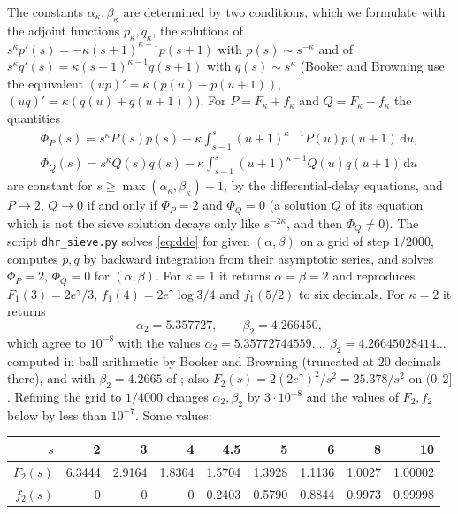 ﻿\documentclass[11pt]{amsart}
\theoremstyle{remark}
\newcommand{\dd}{\mathrm{d}}
\begin{document}
The constants $\alpha_\kappa,\beta_\kappa$ are determined by two conditions, which we formulate with the adjoint functions $p_\kappa,q_\kappa$, the solutions of $s^\kappa p'(s)=-\kappa(s+1)^{\kappa-1}p(s+1)$ with $p(s)\sim s^{-\kappa}$ and of $s^\kappa q'(s)=\kappa(s+1)^{\kappa-1}q(s+1)$ with $q(s)\sim s^{\kappa}$ (Booker and Browning \cite{BB} use the equivalent $(up)'=\kappa(p(u)-p(u+1))$, $(uq)'=\kappa(q(u)+q(u+1))$). For $P=F_\kappa+f_\kappa$ and $Q=F_\kappa-f_\kappa$ the quantities
\begin{gather*}
\Phi_P(s)=s^\kappa P(s)p(s)+\kappa\int_{s-1}^s(u+1)^{\kappa-1}P(u)p(u+1)\,\dd u,\\
\Phi_Q(s)=s^\kappa Q(s)q(s)-\kappa\int_{s-1}^s(u+1)^{\kappa-1}Q(u)q(u+1)\,\dd u
\end{gather*}
are constant for $s\ge\max(\alpha_\kappa,\beta_\kappa)+1$, by the differential-delay equations, and $P\to2$, $Q\to0$ if and only if $\Phi_P=2$ and $\Phi_Q=0$ (a solution $Q$ of its equation which is not the sieve solution decays only like $s^{-2\kappa}$, and then $\Phi_Q\ne0$). The script \texttt{dhr\_sieve.py} solves \eqref{eq:dde} for given $(\alpha,\beta)$ on a grid of step $1/2000$, computes $p,q$ by backward integration from their asymptotic series, and solves $\Phi_P=2$, $\Phi_Q=0$ for $(\alpha,\beta)$. For $\kappa=1$ it returns $\alpha=\beta=2$ and reproduces $F_1(3)=2e^\gamma/3$, $f_1(4)=2e^\gamma\log3/4$ and $f_1(5/2)$ to six decimals. For $\kappa=2$ it returns
\[
\alpha_2=5.357727,\qquad \beta_2=4.266450,
\]
which agree to $10^{-8}$ with the values $\alpha_2=5.35772744559\ldots$, $\beta_2=4.26645028414\ldots$ computed in ball arithmetic by Booker and Browning \cite{BB} (truncated at $20$ decimals there), and with $\beta_2=4.2665$ of \cite{DHR}; also $F_2(s)=2(2e^\gamma)^2/s^2=25.378/s^2$ on $(0,2]$. Refining the grid to $1/4000$ changes $\alpha_2,\beta_2$ by $3\cdot10^{-8}$ and the values of $F_2,f_2$ below by less than $10^{-7}$. Some values:
\begin{center}
\small
\begin{tabular}{r|rrrrrrrr}
$s$ & 2 & 3 & 4 & 4.5 & 5 & 6 & 8 & 10\\
\hline
$F_2(s)$ & 6.3444 & 2.9164 & 1.8364 & 1.5704 & 1.3928 & 1.1136 & 1.0027 & 1.00002\\
$f_2(s)$ & 0 & 0 & 0 & 0.2403 & 0.5790 & 0.8844 & 0.9973 & 0.99998\\
\end{tabular}
\end{center}
\end{document}
